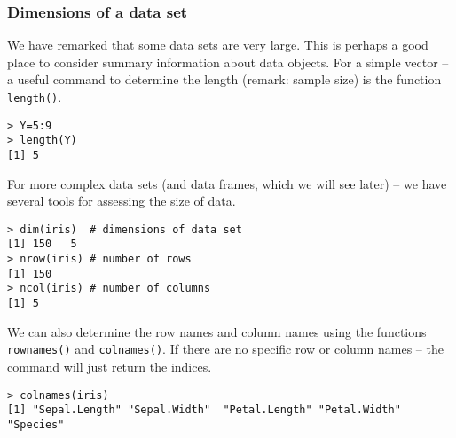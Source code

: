 \documentclass{beamer}
\begin{document}
\begin{frame}[fragile]
\frametitle{Dimensions of a data set}
We have remarked that some data sets are very large. This is perhaps a good place to consider summary information about data objects.
For a simple vector – a useful command to determine the length (remark: sample size) is the function \texttt{length()}.
\begin{framed}
\begin{verbatim}
> Y=5:9
> length(Y)
[1] 5
\end{verbatim}
\end{framed}
\end{frame}
\begin{frame}[fragile]
For more complex data sets (and data frames, which we will see later) – we have several tools for assessing the size of data.
\begin{framed}
\begin{verbatim}
> dim(iris)  # dimensions of data set
[1] 150   5
> nrow(iris) # number of rows
[1] 150
> ncol(iris) # number of columns
[1] 5
\end{verbatim}
\end{framed}
\end{frame}
\begin{frame}[fragile]
We can also determine the row names and column names using the functions \texttt{rownames()} and \texttt{colnames()}.
If there are no specific row or column names – the command will just return the indices.

\begin{framed}
\begin{verbatim}
> colnames(iris)
[1] "Sepal.Length" "Sepal.Width"  "Petal.Length" "Petal.Width"  "Species"

\end{verbatim}
\end{framed}
\end{frame}
\end{document}
